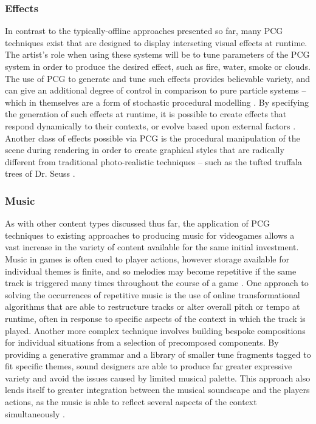 \documentclass{acm_proc_article-sp}
\begin{document}
\subsubsection{Effects}
In contrast to the typically-offline approaches presented so far, many PCG techniques exist that are designed to display interseting visual effects at runtime. The artist's role when using these systems will be to tune parameters of the PCG system in order to produce the desired effect, such as fire, water, smoke or clouds. The use of PCG to generate and tune such effects provides believable variety, and can give an additional degree of control in comparison to pure particle systems -- which in themselves are a form of stochastic procedural modelling \cite{reeves1983particle}. By specifying the generation of such effects at runtime, it is possible to create effects that respond dynamically to their contexts, or evolve based upon external factors \cite{particles}.
Another class of effects possible via PCG is the procedural manipulation of the scene during rendering in order to create graphical styles that are radically different from traditional photo-realistic techniques -- such as the tufted truffala trees of Dr. Seuss \cite{kowalski1999art}.


\subsubsection{Music}
As with other content types discussed thus far, the application of PCG techniques to existing approaches to producing music for videogames allows a vast increase in the variety of content available for the same initial investment. Music in games is often cued to player actions, however storage available for individual themes is finite, and so melodies may become repetitive if the same track is triggered many times throughout the course of a game \cite{collins2009introduction}. One approach to solving the occurrences of repetitive music is the use of online transformational algorithms that are able to restructure tracks or alter overall pitch or tempo at runtime, often in response to specific aspects of the context in which the track is played. Another more complex technique involves building bespoke compositions for individual situations from a selection of precomposed components. By providing a generative grammar and a library of smaller tune fragments tagged to fit specific themes, sound designers are able to produce far greater expressive variety and avoid the issues caused by limited musical palette. This approach also lends itself to greater integration between the musical soundscape and the players actions, as the music is able to reflect several aspects of the context simultaneously \cite{6266725}.
\end{document}

